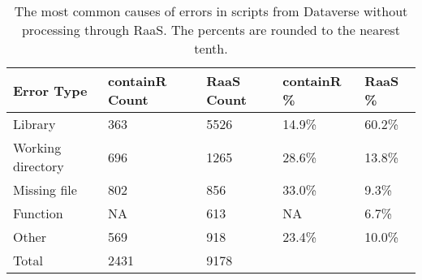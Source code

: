 \begin{table}
\centering
\caption{The most common causes of errors in scripts from Dataverse without processing through RaaS. The percents are rounded to the nearest tenth.}
\label{tab:error-causes}
\begin{tabular}{lllll}
\toprule
       Error Type & containR Count & RaaS Count & containR \% & RaaS \% \\
\midrule
          Library &            363 &       5526 &      14.9\% &  60.2\% \\ \hline
Working directory &            696 &       1265 &      28.6\% &  13.8\% \\ \hline
     Missing file &            802 &        856 &      33.0\% &   9.3\% \\ \hline
         Function &             NA &        613 &         NA &   6.7\% \\ \hline
            Other &            569 &        918 &      23.4\% &  10.0\% \\ \hline
            Total &           2431 &       9178 &            &        \\
\bottomrule
\end{tabular}
\end{table}

